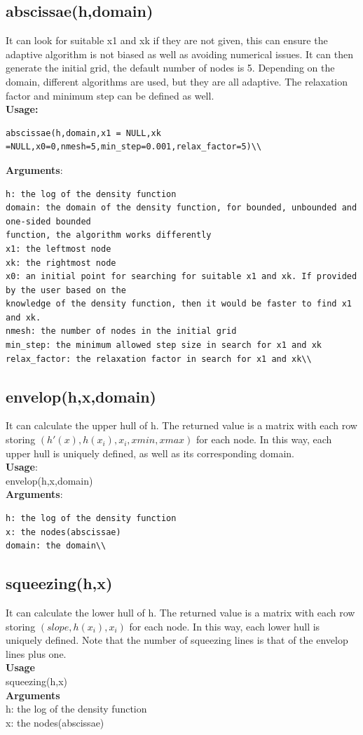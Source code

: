 \documentclass{llncs}\usepackage[]{graphicx}\usepackage[]{color}
\begin{document}
\subsection{abscissae(h,domain)}
It can look for suitable x1 and xk if they are not given, this can ensure the adaptive algorithm is not biased as well as avoiding numerical issues. It can then generate the initial grid, the default number of nodes is 5. Depending on the domain, different algorithms are used, but they are all adaptive. The relaxation factor and minimum step can be defined as well.\\
\textbf{Usage:}\\
\begin{verbatim}
abscissae(h,domain,x1 = NULL,xk =NULL,x0=0,nmesh=5,min_step=0.001,relax_factor=5)\\
\end{verbatim}
\textbf{Arguments}:\\
\begin{verbatim}
h: the log of the density function
domain: the domain of the density function, for bounded, unbounded and one-sided bounded
function, the algorithm works differently
x1: the leftmost node
xk: the rightmost node
x0: an initial point for searching for suitable x1 and xk. If provided by the user based on the
knowledge of the density function, then it would be faster to find x1 and xk.
nmesh: the number of nodes in the initial grid
min_step: the minimum allowed step size in search for x1 and xk
relax_factor: the relaxation factor in search for x1 and xk\\
\end{verbatim}
\subsection{envelop(h,x,domain)}
It can calculate the upper hull of h. The returned value is a matrix with each row storing $(h'(x), h(x_i),x_i,xmin,xmax)$ for each node. In this way, each upper hull is uniquely defined, as well as its corresponding domain.\\
\textbf{Usage}:\\
envelop(h,x,domain)\\
\textbf{Arguments}:\\
\begin{verbatim}
h: the log of the density function
x: the nodes(abscissae)
domain: the domain\\
\end{verbatim}
\subsection{squeezing(h,x)}
It can calculate the lower hull of h. The returned value is a matrix with each row storing $(slope, h(x_i),x_i)$ for each node. In this way, each lower hull is uniquely defined. Note that the number of squeezing lines is that of the envelop lines plus one.\\
\textbf{Usage}\\
squeezing(h,x)\\
\textbf{Arguments}\\
h: the log of the density function\\
x: the nodes(abscissae)\\
\end{document}
